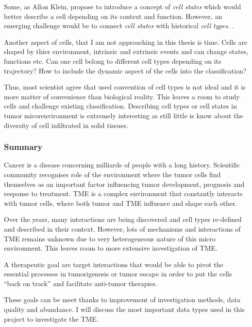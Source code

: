 \documentclass[12pt,]{book}
\theoremstyle{definition}
\theoremstyle{definition}
\theoremstyle{definition}
\theoremstyle{remark}
\begin{document}
Some, as Allon Klein, propose to introduce a concept of \emph{cell
states} which would better describe a cell depending on its context and
function. However, an emerging challenge would be to connect \emph{cell
states} with historical \emph{cell types.}
\citep{EdiorialCellSystems2017} .

Another aspect of cells, that I am not approaching in this thesis is
time. Cells are shaped by thier environment, intrinsic and extrinsic
events and can change states, functions etc. Can one cell belong to
different cell types depending on its trajectory? How to include the
dynamic aspect of the cells into the classification?

Thus, most scientist agree that used convention of cell types is not
ideal and it is more matter of convenience than biological reality. This
leaves a room to study cells and challenge existing classification.
Describing cell types or cell states in tumor micorenvironment is
extremely interesting as still little is know about the diversity of
cell infiltrated in solid tissues.

\hypertarget{summary}{%
\subsubsection{Summary}\label{summary}}

Cancer is a disease concerning milliards of people with a long history.
Scientific community recognises role of the environment where the tumor
cells find themselves as an important factor influencing tumor
development, prognosis and response to treatment. TME is a complex
environment that constantly interacts with tumor cells, where both tumor
and TME influence and shape each other.

Over the years, many interactions are being discovered and cell types
re-defined and described in their context. However, lots of mechanisms
and interactions of TME remains unknown due to very heterogeneous nature
of this micro environment. This leaves room to more extensive
investigation of TME.

A therapeutic goal are target interactions that would be able to pivot
the essential processes in tumorigenesis or tumor escape in order to put
the cells ``back on track'' and facilitate anti-tumor therapies.

These goals can be meet thanks to improvement of investigation methods,
data quality and abundance. I will discuss the most important data types
used in this project to investigate the TME.
\end{document}
